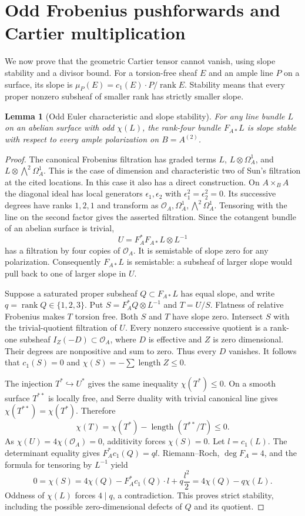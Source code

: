 \documentclass[11pt]{article}
\newtheorem{lemma}[theorem]{Lemma}
\theoremstyle{definition}\newtheorem{definition}[theorem]{Definition}
\theoremstyle{remark}\newtheorem{remark}[theorem]{Remark}
\newcommand{\OO}{\mathcal O}
\newcommand{\rk}{\operatorname{rank}}
\begin{document}
\section{Odd Frobenius pushforwards and Cartier multiplication}\label{sec:cartier}

We now prove that the geometric Cartier tensor cannot vanish, using slope stability and a divisor bound. For a torsion-free sheaf $E$ and an ample line $P$ on a surface, its slope is $\mu_P(E)=c_1(E)\cdot P/\rk E$. Stability means that every proper nonzero subsheaf of smaller rank has strictly smaller slope.

\begin{lemma}[Odd Euler characteristic and slope stability]\label{lem:stable}
For any line bundle $L$ on an abelian surface with odd $\chi(L)$, the rank-four bundle $F_{A*}L$ is slope stable with respect to every ample polarization on $B=A^{(2)}$.
\end{lemma}
\begin{proof}
The canonical Frobenius filtration has graded terms $L$, $L\otimes\Omega_A^1$, and $L\otimes\bigwedge^2\Omega_A^1$. This is the case of dimension and characteristic two of Sun's filtration at the cited locations. In this case it also has a direct construction. On $A\times_B A$ the diagonal ideal has local generators $\epsilon_1,\epsilon_2$ with $\epsilon_1^2=\epsilon_2^2=0$. Its successive degrees have ranks $1,2,1$ and transform as $\OO_A,\Omega_A^1,\bigwedge^2\Omega_A^1$. Tensoring with the line on the second factor gives the asserted filtration. Since the cotangent bundle of an abelian surface is trivial,
\[
 U=F_A^*F_{A*}L\otimes L^{-1}
\]
has a filtration by four copies of $\OO_A$. It is semistable of slope zero for any polarization. Consequently $F_{A*}L$ is semistable: a subsheaf of larger slope would pull back to one of larger slope in $U$.

Suppose a saturated proper subsheaf $Q\subset F_{A*}L$ has equal slope, and write $q=\rk Q\in\{1,2,3\}$. Put $S=F_A^*Q\otimes L^{-1}$ and $T=U/S$. Flatness of relative Frobenius makes $T$ torsion free. Both $S$ and $T$ have slope zero. Intersect $S$ with the trivial-quotient filtration of $U$. Every nonzero successive quotient is a rank-one subsheaf $I_Z(-D)\subset\OO_A$, where $D$ is effective and $Z$ is zero dimensional. Their degrees are nonpositive and sum to zero. Thus every $D$ vanishes. It follows that $c_1(S)=0$ and $\chi(S)=-\sum\operatorname{length}Z\le0$.

The injection $T^*\hookrightarrow U^*$ gives the same inequality $\chi(T^*)\le0$. On a smooth surface $T^{**}$ is locally free, and Serre duality with trivial canonical line gives $\chi(T^{**})=\chi(T^*)$. Therefore
\[
 \chi(T)=\chi(T^*)-\operatorname{length}(T^{**}/T)\le0.
\]
As $\chi(U)=4\chi(\OO_A)=0$, additivity forces $\chi(S)=0$. Let $l=c_1(L)$. The determinant equality gives $F_A^*c_1(Q)=q l$. Riemann--Roch, $\deg F_A=4$, and the formula for tensoring by $L^{-1}$ yield
\[
 0=\chi(S)=4\chi(Q)-F_A^*c_1(Q)\cdot l+q\frac{l^2}{2}
 =4\chi(Q)-q\chi(L).
\]
Oddness of $\chi(L)$ forces $4\mid q$, a contradiction. This proves strict stability, including the possible zero-dimensional defects of $Q$ and its quotient.
\end{proof}
\end{document}
